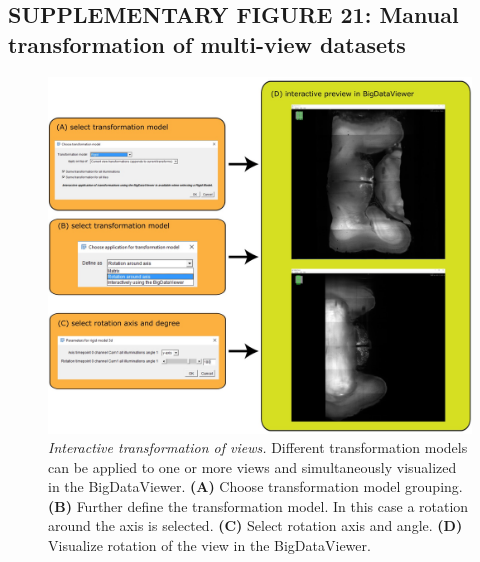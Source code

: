 \documentclass[]{spie}  %
\begin{document}
\subsection*{SUPPLEMENTARY FIGURE 21: Manual transformation of multi-view datasets}
\vspace{1mm}
\begin{figure}[h!]
\includegraphics[width=\textwidth]{Supp-Transformation.jpg}
\vspace{-2.0mm}
\caption{\hspace{-0.5mm} \emph{Interactive transformation of views.} Different transformation models can be applied to one or more views and simultaneously visualized in the BigDataViewer. \textbf{(A)} Choose transformation model grouping. \textbf{(B)} Further define the transformation model. In this case a rotation around the axis is selected. \textbf{(C)} Select rotation axis and angle. \textbf{(D)} Visualize rotation of the view in the BigDataViewer.
}
\label{fig:sup-fig-manual-align2}
\end{figure}

\pagebreak
\end{document}
